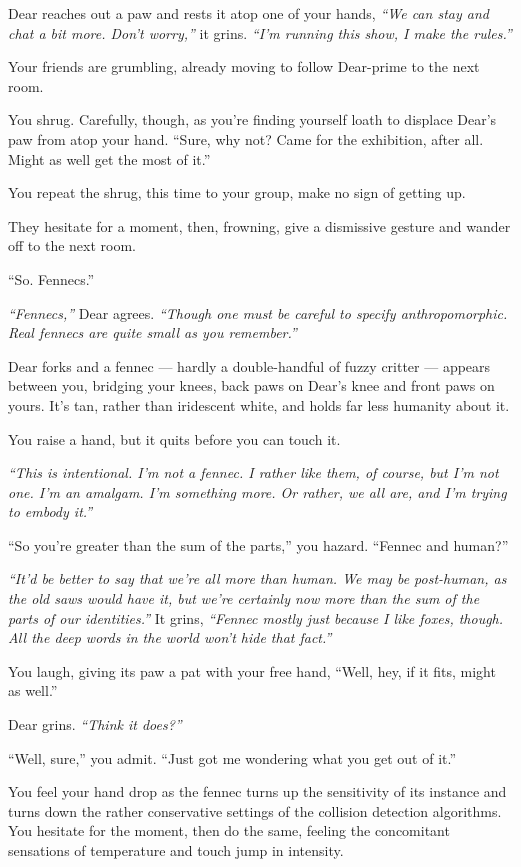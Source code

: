 Dear reaches out a paw and rests it atop one of your hands, \emph{``We can stay and chat a bit more. Don't worry,''} it grins. \emph{``I'm running this show, I make the rules.''}

Your friends are grumbling, already moving to follow Dear-prime to the next room.


You shrug. Carefully, though, as you're finding yourself loath to displace Dear's paw from atop your hand. ``Sure, why not? Came for the exhibition, after all. Might as well get the most of it.''

You repeat the shrug, this time to your group, make no sign of getting up.

They hesitate for a moment, then, frowning, give a dismissive gesture and wander off to the next room.

``So. Fennecs.''

\emph{``Fennecs,''} Dear agrees. \emph{``Though one must be careful to specify anthropomorphic. Real fennecs are quite small as you remember.''}

Dear forks and a fennec --- hardly a double-handful of fuzzy critter --- appears between you, bridging your knees, back paws on Dear's knee and front paws on yours. It's tan, rather than iridescent white, and holds far less humanity about it.

You raise a hand, but it quits before you can touch it.

\emph{``This is intentional. I'm not a fennec. I rather like them, of course, but I'm not one. I'm an amalgam. I'm something more. Or rather, we all are, and I'm trying to embody it.''}

``So you're greater than the sum of the parts,'' you hazard. ``Fennec and human?''

\emph{``It'd be better to say that we're all more than human. We may be post-human, as the old saws would have it, but we're certainly now more than the sum of the parts of our identities.''} It grins, \emph{``Fennec mostly just because I like foxes, though. All the deep words in the world won't hide that fact.''}

You laugh, giving its paw a pat with your free hand, ``Well, hey, if it fits, might as well.''

Dear grins. \emph{``Think it does?''}

``Well, sure,'' you admit. ``Just got me wondering what you get out of it.''

You feel your hand drop as the fennec turns up the sensitivity of its instance and turns down the rather conservative settings of the collision detection algorithms. You hesitate for the moment, then do the same, feeling the concomitant sensations of temperature and touch jump in intensity.

